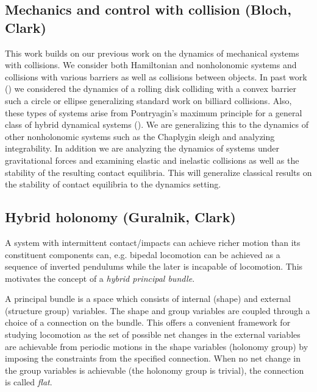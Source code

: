 \documentclass[letterpaper,11pt]{article}
\begin{document}
\subsection{Mechanics and control with collision (Bloch, Clark)}
This work builds on our previous work on the dynamics  of mechanical 
systems with collisions. We consider both Hamiltonian and nonholonomic 
systems and collisions with various barriers as well as collisions 
between objects. In past work (\cite{clark2019bouncing}) we considered the dynamics of a rolling disk 
colliding with a convex barrier such a circle or ellipse generalizing 
standard work on billiard collisions. Also, these types of systems arise from Pontryagin's maximum principle for a general class of hybrid dynamical systems (\cite{clark_oc}). We are generalizing this to 
the dynamics of other nonholonomic systems such as the Chaplygin sleigh 
and analyzing integrability. In addition we are analyzing the dynamics 
of systems under gravitational forces and examining  elastic and 
inelastic collisions as well as the stability of the resulting contact 
equilibria.  This will generalize classical results on the stability of 
contact equilibria to the dynamics setting. 

\subsection{Hybrid holonomy (Guralnik, Clark)}
%
A system with intermittent contact/impacts can achieve richer motion than its constituent components can, e.g. bipedal locomotion can be achieved as a sequence of inverted pendulums while the later is incapable of locomotion. This motivates the concept of a \textit{hybrid principal bundle}.

A principal bundle is a space which consists of internal (shape) and external (structure group) variables. The shape and group variables are coupled through a choice of a connection on the bundle. This offers a convenient framework for studying locomotion as the set of possible net changes in the external variables are achievable from periodic motions in the shape variables (holonomy group) by imposing the constraints from the specified connection. When no net change in the group variables is achievable (the holonomy group is trivial), the connection is called \textit{flat}.
\end{document}
